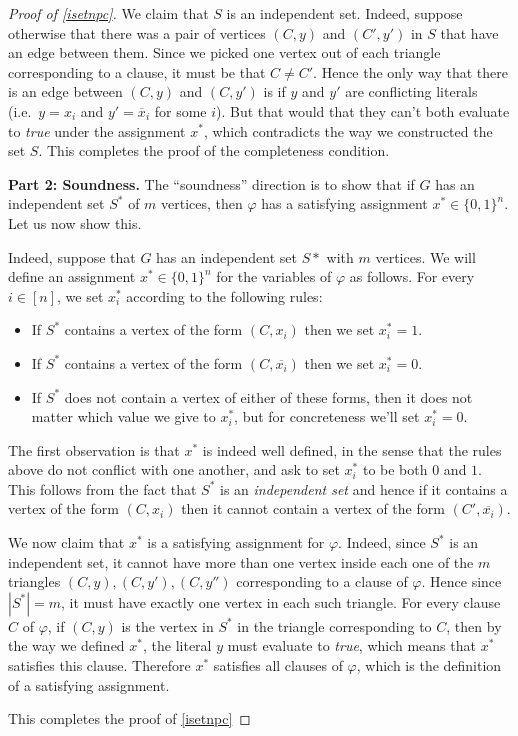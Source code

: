 \begin{proof}[Proof of \cref{isetnpc}]
We claim that \(S\) is an independent set. Indeed, suppose otherwise
that there was a pair of vertices \((C,y)\) and \((C',y')\) in \(S\)
that have an edge between them. Since we picked one vertex out of each
triangle corresponding to a clause, it must be that \(C \neq C'\). Hence
the only way that there is an edge between \((C,y)\) and \((C,y')\) is
if \(y\) and \(y'\) are conflicting literals (i.e.~\(y=x_i\) and
\(y'=\overline{x}_i\) for some \(i\)). But that would that they can't
both evaluate to \emph{true} under the assignment \(x^*\), which
contradicts the way we constructed the set \(S\). This completes the
proof of the completeness condition.

\textbf{Part 2: Soundness.} The ``soundness'' direction is to show that
if \(G\) has an independent set \(S^*\) of \(m\) vertices, then
\(\varphi\) has a satisfying assignment \(x^* \in \{0,1\}^n\). Let us
now show this.

Indeed, suppose that \(G\) has an independent set \(S*\) with \(m\)
vertices. We will define an assignment \(x^* \in \{0,1\}^n\) for the
variables of \(\varphi\) as follows. For every \(i\in [n]\), we set
\(x^*_i\) according to the following rules:

\begin{itemize}
\item
  If \(S^*\) contains a vertex of the form \((C,x_i)\) then we set
  \(x^*_i=1\).
\item
  If \(S^*\) contains a vertex of the form \((C,\overline{x_i})\) then
  we set \(x^*_i=0\).
\item
  If \(S^*\) does not contain a vertex of either of these forms, then it
  does not matter which value we give to \(x^*_i\), but for concreteness
  we'll set \(x^*_i=0\).
\end{itemize}

The first observation is that \(x^*\) is indeed well defined, in the
sense that the rules above do not conflict with one another, and ask to
set \(x^*_i\) to be both \(0\) and \(1\). This follows from the fact
that \(S^*\) is an \emph{independent set} and hence if it contains a
vertex of the form \((C,x_i)\) then it cannot contain a vertex of the
form \((C',\overline{x_i})\).

We now claim that \(x^*\) is a satisfying assignment for \(\varphi\).
Indeed, since \(S^*\) is an independent set, it cannot have more than
one vertex inside each one of the \(m\) triangles
\((C,y),(C,y'),(C,y'')\) corresponding to a clause of \(\varphi\). Hence
since \(|S^*|=m\), it must have exactly one vertex in each such
triangle. For every clause \(C\) of \(\varphi\), if \((C,y)\) is the
vertex in \(S^*\) in the triangle corresponding to \(C\), then by the
way we defined \(x^*\), the literal \(y\) must evaluate to \emph{true},
which means that \(x^*\) satisfies this clause. Therefore \(x^*\)
satisfies all clauses of \(\varphi\), which is the definition of a
satisfying assignment.

This completes the proof of \cref{isetnpc}

\end{proof}


